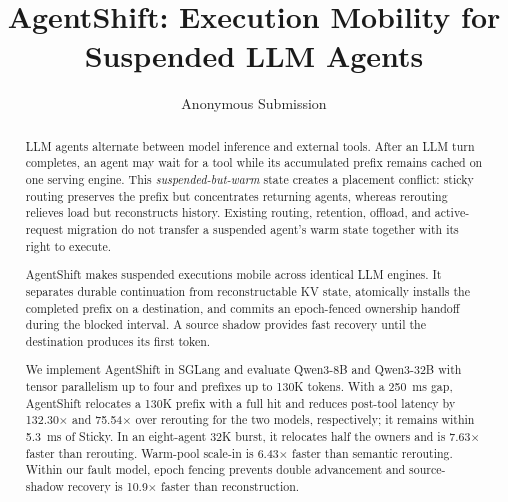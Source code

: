 \documentclass[letterpaper,twocolumn,10pt]{article}
\title{\Large \bf AgentShift: Execution Mobility for Suspended LLM Agents}
\author{Anonymous Submission}
\date{}
\begin{document}
\maketitle

\begin{abstract}
LLM agents alternate between model inference and external tools. After an LLM
turn completes, an agent may wait for a tool while its accumulated prefix
remains cached on one serving engine. This \emph{suspended-but-warm} state
creates a placement conflict: sticky routing preserves the prefix but
concentrates returning agents, whereas rerouting relieves load but reconstructs
history. Existing routing, retention, offload, and active-request migration do
not transfer a suspended agent's warm state together with its right to execute.

AgentShift makes suspended executions mobile across identical LLM engines. It
separates durable continuation from reconstructable KV state, atomically
installs the completed prefix on a destination, and commits an epoch-fenced
ownership handoff during the blocked interval. A source shadow provides fast
recovery until the destination produces its first token.

We implement AgentShift in SGLang and evaluate Qwen3-8B and Qwen3-32B with
tensor parallelism up to four and prefixes up to 130K tokens. With a 250~ms
gap, AgentShift relocates a 130K prefix with a full hit and reduces post-tool
latency by 132.30$\times$ and 75.54$\times$ over rerouting for the two models,
respectively; it remains within 5.3~ms of Sticky. In an eight-agent 32K burst,
it relocates half the owners and is 7.63$\times$ faster than rerouting. Warm-pool
scale-in is 6.43$\times$ faster than semantic rerouting. Within our fault model,
epoch fencing prevents double advancement and source-shadow recovery is
10.9$\times$ faster than reconstruction.
\end{abstract}





\end{document}
